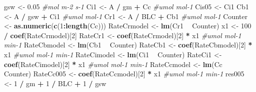 \documentclass[
]{krantz}
\makeatletter
\newenvironment{Shaded}{\begin{snugshade}}{\end{snugshade}}
\newcommand{\CommentTok}[1]{\textcolor[rgb]{0.56,0.35,0.01}{\textit{#1}}}
\newcommand{\DecValTok}[1]{\textcolor[rgb]{0.00,0.00,0.81}{#1}}
\newcommand{\FloatTok}[1]{\textcolor[rgb]{0.00,0.00,0.81}{#1}}
\newcommand{\KeywordTok}[1]{\textcolor[rgb]{0.13,0.29,0.53}{\textbf{#1}}}
\newcommand{\NormalTok}[1]{#1}
\newcommand{\OperatorTok}[1]{\textcolor[rgb]{0.81,0.36,0.00}{\textbf{#1}}}
\newcommand{\StringTok}[1]{\textcolor[rgb]{0.31,0.60,0.02}{#1}}
\newenvironment{kframe}{%
\medskip{}
\setlength{\fboxsep}{.8em}
 \def\at@end@of@kframe{}%
 \ifinner\ifhmode%
  \def\at@end@of@kframe{\end{minipage}}%
  \begin{minipage}{\columnwidth}%
 \fi\fi%
 \def\FrameCommand##1{\hskip\@totalleftmargin \hskip-\fboxsep
 \colorbox{shadecolor}{##1}\hskip-\fboxsep
     \hskip-\linewidth \hskip-\@totalleftmargin \hskip\columnwidth}%
 \MakeFramed {\advance\hsize-\width
   \@totalleftmargin\z@ \linewidth\hsize
   \@setminipage}}%
 {\par\unskip\endMakeFramed%
 \at@end@of@kframe}
\renewenvironment{Shaded}{\begin{kframe}}{\end{kframe}}
\makeatother
\begin{document}
\begin{Shaded}
\begin{Highlighting}[]
\NormalTok{gsw <-}\StringTok{ }\FloatTok{0.05} \CommentTok{#mol m-2 s-1}
\NormalTok{Ci1 <-}\StringTok{ }\NormalTok{A }\OperatorTok{/}\StringTok{ }\NormalTok{gm }\OperatorTok{+}\StringTok{ }\NormalTok{Cc }\CommentTok{#umol mol-1}
\NormalTok{Cis05 <-}\StringTok{ }\NormalTok{Ci1}
\NormalTok{Cb1 <-}\StringTok{ }\NormalTok{A }\OperatorTok{/}\StringTok{ }\NormalTok{gsw }\OperatorTok{+}\StringTok{ }\NormalTok{Ci1 }\CommentTok{#umol mol-1}
\NormalTok{Cr1 <-}\StringTok{ }\NormalTok{A }\OperatorTok{/}\StringTok{ }\NormalTok{BLC }\OperatorTok{+}\StringTok{ }\NormalTok{Cb1 }\CommentTok{#umol mol-1}
\NormalTok{Counter <-}\StringTok{ }\KeywordTok{as.numeric}\NormalTok{(}\KeywordTok{c}\NormalTok{(}\DecValTok{1}\OperatorTok{:}\KeywordTok{length}\NormalTok{(Cc)))}
\NormalTok{RateCrmodel <-}\StringTok{ }\KeywordTok{lm}\NormalTok{(Cr1 }\OperatorTok{~}\StringTok{ }\NormalTok{Counter)}
\NormalTok{x1 <-}\StringTok{ }\DecValTok{100} \OperatorTok{/}\StringTok{ }\KeywordTok{coef}\NormalTok{(RateCrmodel)[}\DecValTok{2}\NormalTok{]}
\NormalTok{RateCr1 <-}\StringTok{ }\KeywordTok{coef}\NormalTok{(RateCrmodel)[}\DecValTok{2}\NormalTok{] }\OperatorTok{*}\StringTok{ }\NormalTok{x1 }\CommentTok{#umol mol-1 min-1}
\NormalTok{RateCbmodel <-}\StringTok{ }\KeywordTok{lm}\NormalTok{(Cb1 }\OperatorTok{~}\StringTok{ }\NormalTok{Counter)}
\NormalTok{RateCb1 <-}\StringTok{ }\KeywordTok{coef}\NormalTok{(RateCbmodel)[}\DecValTok{2}\NormalTok{] }\OperatorTok{*}\StringTok{ }\NormalTok{x1 }\CommentTok{#umol mol-1 min-1}
\NormalTok{RateCimodel <-}\StringTok{ }\KeywordTok{lm}\NormalTok{(Ci1 }\OperatorTok{~}\StringTok{ }\NormalTok{Counter)}
\NormalTok{RateCi1 <-}\StringTok{ }\KeywordTok{coef}\NormalTok{(RateCimodel)[}\DecValTok{2}\NormalTok{] }\OperatorTok{*}\StringTok{ }\NormalTok{x1 }\CommentTok{#umol mol-1 min-1}
\NormalTok{RateCcmodel <-}\StringTok{ }\KeywordTok{lm}\NormalTok{(Cc }\OperatorTok{~}\StringTok{ }\NormalTok{Counter)}
\NormalTok{RateCc005 <-}\StringTok{ }\KeywordTok{coef}\NormalTok{(RateCcmodel)[}\DecValTok{2}\NormalTok{] }\OperatorTok{*}\StringTok{ }\NormalTok{x1 }\CommentTok{#umol mol-1 min-1}
\NormalTok{res005 <-}\StringTok{ }\DecValTok{1} \OperatorTok{/}\StringTok{ }\NormalTok{gm }\OperatorTok{+}\StringTok{ }\DecValTok{1} \OperatorTok{/}\StringTok{ }\NormalTok{BLC }\OperatorTok{+}\StringTok{ }\DecValTok{1} \OperatorTok{/}\StringTok{ }\NormalTok{gsw}


\end{Highlighting}
\end{Shaded}
\end{document}
